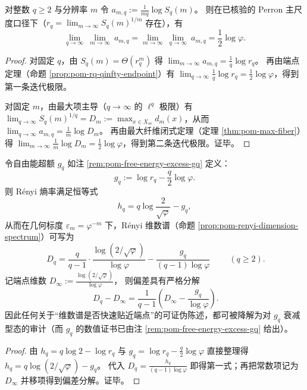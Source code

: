 
\begin{corollary}\label{cor:pom-double-limit-rigidity-half-logphi}
对整数 \(q\ge 2\) 与分辨率 \(m\) 令
\(
a_{m,q}:=\frac{1}{mq}\log S_q(m)
\)。
则在已核验的 Perron 主尺度口径下（\(r_q=\lim_{m\to\infty}S_q(m)^{1/m}\) 存在），有
\[
\lim_{q\to\infty}\ \lim_{m\to\infty}\ a_{m,q}
=\lim_{m\to\infty}\ \lim_{q\to\infty}\ a_{m,q}
=\frac12\log\varphi.
\]
\end{corollary}
\begin{proof}
对固定 \(q\)，由 \(S_q(m)=\Theta(r_q^m)\) 得
\(
\lim_{m\to\infty}a_{m,q}=\frac{1}{q}\log r_q
\)。
再由端点定理（命题 \ref{prop:pom-rq-qinfty-endpoint}）有
\(
\lim_{q\to\infty}\frac{1}{q}\log r_q=\frac12\log\varphi
\)，得到第一条迭代极限。
\par
对固定 \(m\)，由最大项主导（\(q\to\infty\) 的 \(\ell^q\) 极限）有
\(
\lim_{q\to\infty}S_q(m)^{1/q}=D_m:=\max_{x\in X_m}d_m(x)
\)，从而
\(
\lim_{q\to\infty}a_{m,q}=\frac{1}{m}\log D_m
\)。
再由最大纤维闭式定理（定理 \ref{thm:pom-max-fiber}）得
\(
\lim_{m\to\infty}\frac{1}{m}\log D_m=\frac12\log\varphi
\)，得到第二条迭代极限。证毕。
\end{proof}

\begin{corollary}\label{cor:pom-Dq-convergence-controlled-by-gq}
令自由能超额 \(g_q\) 如注 \ref{rem:pom-free-energy-excess-gq} 定义：
\[
g_q:=\log r_q-\frac{q}{2}\log\varphi.
\]
则 Rényi 熵率满足恒等式
\[
h_q=q\log\frac{2}{\sqrt{\varphi}}-g_q,
\]
从而在几何标度 \(\varepsilon_m=\varphi^{-m}\) 下，Rényi 维数谱（命题 \ref{prop:pom-renyi-dimension-spectrum}）可写为
\[
\boxed{\;
D_q
=\frac{q}{q-1}\cdot\frac{\log(2/\sqrt{\varphi})}{\log\varphi}
-\frac{g_q}{(q-1)\log\varphi}\;}
\qquad(q\ge 2).
\]
记端点维数
\(
D_\infty:=\frac{\log(2/\sqrt{\varphi})}{\log\varphi}
\)，
则偏差具有严格分解
\[
\boxed{\;
D_q-D_\infty=\frac{1}{q-1}\left(D_\infty-\frac{g_q}{\log\varphi}\right).}
\]
因此任何关于“维数谱是否快速贴近端点”的可证伪陈述，都可被降解为对 \(g_q\) 衰减型态的审计（而 \(g_q\) 的数值证书已由注 \ref{rem:pom-free-energy-excess-gq} 给出）。
\end{corollary}
\begin{proof}
由 \(h_q=q\log 2-\log r_q\) 与 \(g_q=\log r_q-\frac{q}{2}\log\varphi\) 直接整理得
\(
h_q=q\log(2/\sqrt{\varphi})-g_q
\)。
代入 \(D_q=\frac{h_q}{(q-1)\log\varphi}\) 即得第一式；再把常数项记为 \(D_\infty\) 并移项得到偏差分解。证毕。
\end{proof}

